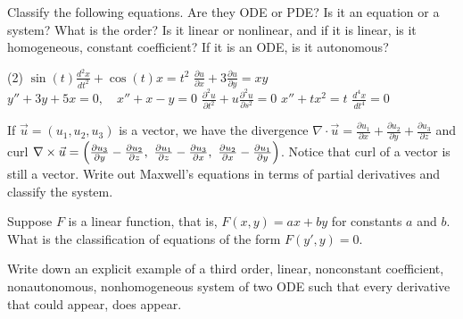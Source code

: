 \begin{exercise}
Classify the following equations.  Are they ODE or PDE?  Is it an equation
or a system?  What is the order?  Is it linear or nonlinear, and if it is
linear, is it homogeneous, constant coefficient?  If it is an ODE\@, is it
autonomous?
\begin{tasks}(2)
\task $\displaystyle \sin(t) \frac{d^2 x}{dt^2} + \cos(t) x = t^2$
\task $\displaystyle \frac{\partial u}{\partial x} + 3 \frac{\partial u}{\partial y} = xy$
\task $\displaystyle y''+3y+5x=0, \quad x''+x-y=0$
\task $\displaystyle \frac{\partial^2 u}{\partial t^2} + u\frac{\partial^2 u}{\partial s^2} =
0$
\task $\displaystyle x''+tx^2=t$
\task $\displaystyle \frac{d^4 x}{dt^4} = 0$
\end{tasks}
\end{exercise}

\begin{exercise}
If $\vec{u} = (u_1,u_2,u_3)$ is a vector, we have the divergence
$\nabla \cdot \vec{u} =
\frac{\partial u_1}{\partial x} +
\frac{\partial u_2}{\partial y} +
\frac{\partial u_3}{\partial z}$ and curl
$\nabla \times \vec{u} =
\Bigl(
\frac{\partial u_3}{\partial y} - \frac{\partial u_2}{\partial z} , ~
\frac{\partial u_1}{\partial z} - \frac{\partial u_3}{\partial x} , ~
\frac{\partial u_2}{\partial x} - \frac{\partial u_1}{\partial y} \Bigr)$.
Notice that curl of a vector is still a vector.  Write out Maxwell's
equations in terms of partial derivatives and classify the system.
\end{exercise}

\begin{exercise}
Suppose $F$ is a linear function, that is,
$F(x,y) = ax+by$ for constants $a$ and $b$.  What is the
classification of equations of the form $F(y',y) = 0$.
\end{exercise}

\begin{exercise}
Write down an explicit example of a third order, linear, nonconstant coefficient,
nonautonomous, nonhomogeneous system of two ODE such that every derivative
that could appear, does appear.
\end{exercise}

\setcounter{exercise}{100}

